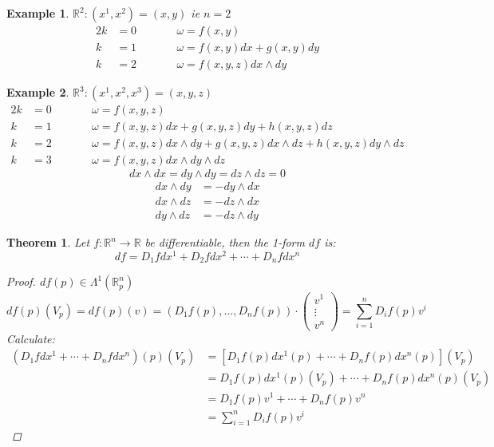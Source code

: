 \documentclass[11pt]{article}
\def\RR{\mathbb{R}}
\newtheorem{theorem}{Theorem}[section]
\newtheorem{example}{Example}[section]
\begin{document}
\begin{example} $\RR^2:(x^1, x^2 ) = (x,y)$ ie $n=2$
\begin{alignat*}{2}
k&=0 &\qquad &\omega = f(x,y)\\
k&=1 &\qquad &\omega = f(x,y)dx + g(x,y)dy\\
k&=2 &\qquad &\omega = f(x,y,z)dx\wedge dy
\end{alignat*}
\end{example}

\begin{example} $\RR^3:(x^1, x^2 , x^3) = (x,y,z)$
\begin{alignat*}{2}
k&=0 &\qquad &\omega = f(x,y,z)\\
k&=1 &\qquad &\omega = f(x,y,z)dx + g(x,y,z)dy + h(x,y,z)dz\\
k&=2 &\qquad &\omega = f(x,y,z)dx\wedge dy + g(x,y,z)dx\wedge dz + h(x,y,z)dy\wedge dz\\
k&=3 &\qquad &\omega = f(x,y,z)dx\wedge dy \wedge dz
\end{alignat*}
\[dx\wedge dx = dy\wedge dy =dz\wedge dz =0\]
\begin{align*}
dx\wedge dy &= -dy \wedge dx\\
dx\wedge dz &= -dz \wedge dx\\
dy\wedge dz &= -dz \wedge dy 
\end{align*}
\end{example}

\begin{theorem}
Let $f:\RR^n \rightarrow \RR$ be differentiable, then the 1-form $df$ is:
\[df = D_1fdx^1 + D_2fdx^2 + \cdots + D_nfdx^n \]
\begin{proof}
$df(p) \in \Lambda^1(\RR_p^n)$
\[df(p)(V_p) = df(p)(v) = (D_1f(p), \dots , D_nf(p))\cdot \left(\! \!\begin{array}{c} v^1\\ \vdots \\ v^n \end{array} \! \! \right) = \sum\limits_{i=1}^{n}D_if(p)v^i \]
Calculate:
\begin{align*}
(D_1fdx^1 + \cdots + D_nfdx^n )(p)(V_p) &= [D_1f(p)dx^1(p)+ \cdots + D_nf(p)dx^n(p)] (V_p)\\
&=D_1f(p)dx^1(p)(V_p)+ \cdots + D_nf(p)dx^n(p)(V_p)\\
&=D_1f(p)v^1+ \cdots + D_nf(p)v^n\\
&=\sum\limits_{i=1}^{n}D_if(p)v^i 
\end{align*}
\end{proof}
\end{theorem}
\end{document}
